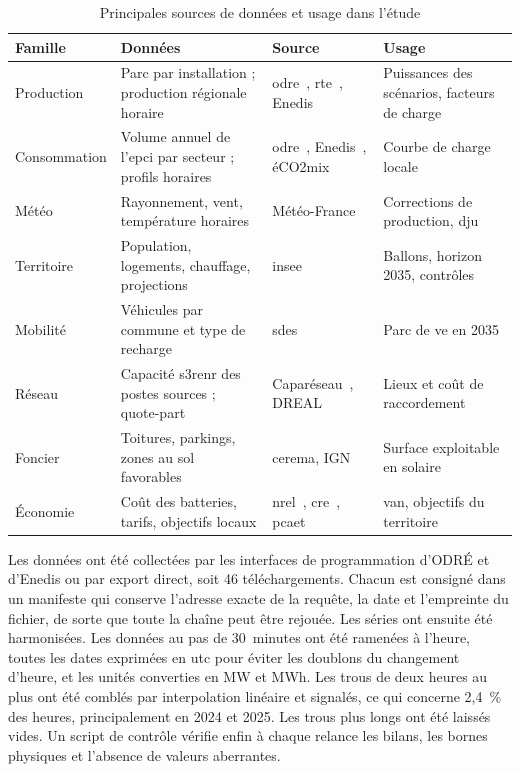 \begin{table}[H]
\centering
\footnotesize
\caption{Principales sources de données et usage dans l'étude}
\label{tab:sources}
{\renewcommand{\arraystretch}{1.2}
\begin{tabularx}{\textwidth}{@{}>{\raggedright\arraybackslash}p{2.1cm}>{\raggedright\arraybackslash}X>{\raggedright\arraybackslash}p{2.9cm}>{\raggedright\arraybackslash}X@{}}
\toprule
\textbf{Famille} & \textbf{Données} & \textbf{Source} & \textbf{Usage} \\
\midrule
Production & Parc par installation ; production régionale horaire & \gls{odre}~\cite{odre_registre}, \gls{rte}~\cite{rte_eco2mix}, Enedis~\cite{enedis_agregats} & Puissances des scénarios, facteurs de charge \\
Consommation & Volume annuel de l'\gls{epci} par secteur ; profils horaires & \gls{odre}~\cite{odre_conso}, Enedis~\cite{enedis_secteur}, éCO2mix & Courbe de charge locale \\
Météo & Rayonnement, vent, température horaires & Météo-France~\cite{meteofrance} & Corrections de production, \gls{dju} \\
Territoire & Population, logements, chauffage, projections & \gls{insee}~\cite{insee_dossier, insee_omphale} & Ballons, horizon 2035, contrôles \\
Mobilité & Véhicules par commune et type de recharge & \gls{sdes}~\cite{sdes_ve} & Parc de \gls{ve} en 2035 \\
Réseau & Capacité \gls{s3renr} des postes sources ; quote-part & Caparéseau~\cite{capareseau}, DREAL~\cite{dreal_s3renr} & Lieux et coût de raccordement \\
Foncier & Toitures, parkings, zones au sol favorables & \gls{cerema}, IGN~\cite{cerema_pv} & Surface exploitable en solaire \\
Économie & Coût des batteries, tarifs, objectifs locaux & \gls{nrel}~\cite{nrel2025}, \gls{cre}~\cite{cre_trve}, \gls{pcaet}~\cite{pcaet} & \gls{van}, objectifs du territoire \\
\bottomrule
\end{tabularx}}
\end{table}

Les données ont été collectées par les interfaces de programmation d'ODRÉ et d'Enedis ou par export direct, soit 46 téléchargements. Chacun est consigné dans un manifeste qui conserve l'adresse exacte de la requête, la date et l'empreinte du fichier, de sorte que toute la chaîne peut être rejouée. Les séries ont ensuite été harmonisées. Les données au pas de 30~minutes ont été ramenées à l'heure, toutes les dates exprimées en \gls{utc} pour éviter les doublons du changement d'heure, et les unités converties en MW et MWh. Les trous de deux heures au plus ont été comblés par interpolation linéaire et signalés, ce qui concerne 2,4~\% des heures, principalement en 2024 et 2025. Les trous plus longs ont été laissés vides. Un script de contrôle vérifie enfin à chaque relance les bilans, les bornes physiques et l'absence de valeurs aberrantes.

